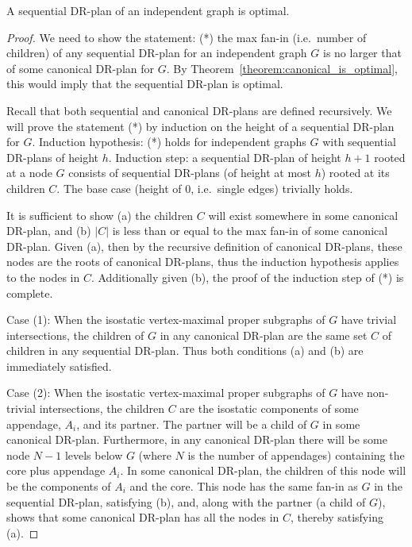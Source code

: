 \begin{observation}
    A sequential DR-plan of an independent graph is optimal.
\end{observation}

\begin{proof}
    We need to show the statement:
    (*) the max fan-in (i.e.\ number of children) of any sequential DR-plan for an independent graph $G$ is no larger that of some canonical DR-plan for $G$. By Theorem~\ref{theorem:canonical_is_optimal}, this would imply that the sequential DR-plan is optimal.

    Recall that both sequential and canonical DR-plans are defined recursively. We will prove the statement (*) by induction on the height of a sequential DR-plan for $G$. Induction hypothesis: (*) holds for independent graphs $G$ with sequential DR-plans of height $h$. Induction step: a sequential DR-plan of height $h+1$ rooted at a node $G$ consists of sequential DR-plans (of height at most $h$) rooted at its children $C$.
    The base case (height of 0, i.e.\ single edges) trivially holds.

    It is sufficient to show (a) the children $C$ will exist somewhere in some canonical DR-plan, and (b) $|C|$ is less than or equal to the max fan-in of some canonical DR-plan. Given (a), then by the recursive definition of canonical DR-plans, these nodes are the roots of canonical DR-plans, thus the induction hypothesis applies to the nodes in $C$. Additionally given (b), the proof of the induction step of (*) is complete.

    Case (1):
    When the isostatic vertex-maximal proper subgraphs of $G$ have trivial intersections, the children of $G$ in any canonical DR-plan are the same set $C$ of children in any sequential DR-plan. Thus both conditions (a) and (b) are immediately satisfied.

    Case (2):
    When the isostatic vertex-maximal proper subgraphs of $G$ have non-trivial intersections, the children $C$ are the isostatic components of some appendage, $A_i$, and its partner. The partner will be a child of $G$ in some canonical DR-plan. Furthermore, in any canonical DR-plan there will be some node $N-1$ levels below $G$ (where $N$ is the number of appendages) containing the core plus appendage $A_i$. In some canonical DR-plan, the children of this node will be the components of $A_i$ and the core. This node has the same fan-in as $G$ in the sequential DR-plan, satisfying (b), and, along with the partner (a child of $G$), shows that some canonical DR-plan has all the nodes in $C$, thereby satisfying (a).
\end{proof}

